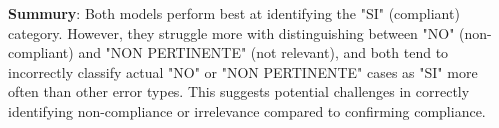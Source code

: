 \documentclass[../main.tex]{subfiles}
\begin{document}
\textbf{Summury}: Both models perform best at identifying the "SI" (compliant) category. However, they struggle more with distinguishing between "NO" (non-compliant) and "NON PERTINENTE" (not relevant), and both tend to incorrectly classify actual "NO" or "NON PERTINENTE" cases as "SI" more often than other error types. This suggests potential challenges in correctly identifying non-compliance or irrelevance compared to confirming compliance. 


\ifSubfilesClassLoaded{
    
    
}{}
\end{document}
